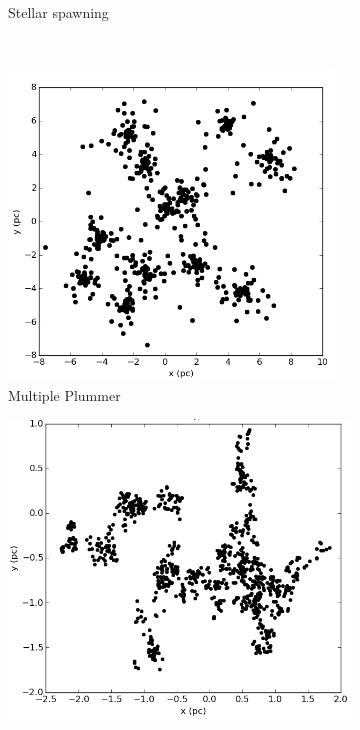\begin{figure}
\begin{subfigure}[b]{0.48\textwidth}
        \caption{Stellar spawning}
        \label{Fig:0_substructure_1}
    \end{subfigure}
    \\
    \begin{subfigure}[b]{0.48\textwidth}
        \includegraphics[width=0.95\textwidth]{Figures/0_plummers.png}
        \caption{Multiple Plummer}
        \label{Fig:0_substructure_2}
    \end{subfigure}
    \begin{subfigure}[b]{0.48\textwidth}
        \includegraphics[width=\textwidth]{Figures/0_fractals.png}

\end{subfigure}
\end{figure}
